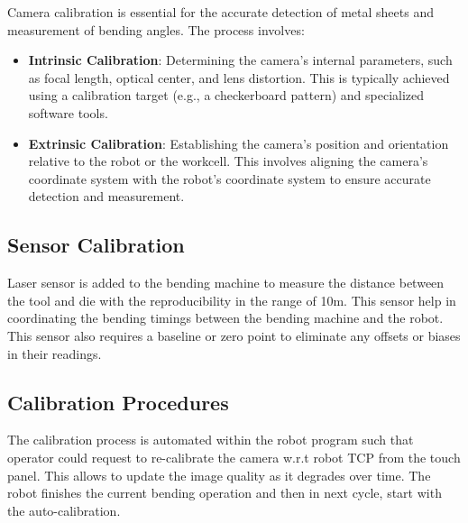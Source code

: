 Camera calibration is essential for the accurate detection of metal sheets and measurement of bending angles. The process involves:

\begin{itemize}
    \item \textbf{Intrinsic Calibration}: Determining the camera's internal parameters, such as focal length, optical center, and lens distortion. This is typically achieved using a calibration target (e.g., a checkerboard pattern) and specialized software tools.
    \item \textbf{Extrinsic Calibration}: Establishing the camera's position and orientation relative to the robot or the workcell. This involves aligning the camera's coordinate system with the robot’s coordinate system to ensure accurate detection and measurement.
\end{itemize}

\subsection{Sensor Calibration}
Laser sensor is added to the bending machine to measure the distance between the tool and die with the reproducibility in the range of 10\textmu m. This sensor help in coordinating the bending timings between the bending machine and the robot. This sensor also requires a baseline or zero point to eliminate any offsets or biases in their readings.

\subsection{Calibration Procedures}

The calibration process is automated within the robot program
such that operator could request to re-calibrate the camera w.r.t
robot TCP from the touch panel. This allows to update the image quality as it degrades over time. 
The robot finishes the current
bending operation and then in next cycle, start with the auto-calibration.

